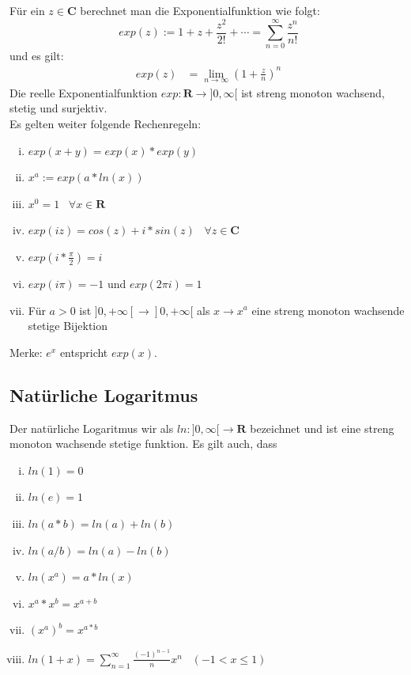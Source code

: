 \documentclass[8pt]{article}
\begin{document}
\begin{multicols*}{3}
Für ein $z \in \mathbf{C}$ berechnet man die Exponentialfunktion wie folgt:
$$
  exp(z) := 1 + z + \frac{z^2}{2!} + \cdots = \sum_{n = 0}^\infty \frac{z^n}{n!}
$$
und es gilt:
\begin{align*}
  exp(z) &= \lim_{n \rightarrow \infty} (1 + \frac{z}{n})^n
\end{align*}
Die reelle Exponentialfunktion $exp: \mathbf{R} \rightarrow ]0, \infty[$ ist streng monoton wachsend,
stetig und surjektiv.\\
Es gelten weiter folgende Rechenregeln:
\begin{enumerate}[(i)]
  \item $exp(x + y) = exp(x) * exp(y)$
  \item $x^a := exp(a * ln(x))$
  \item $x^0 = 1 \;\;\; \forall x \in \mathbf{R}$
  \item $exp(iz) = cos(z) + i*sin(z) \;\;\; \forall z \in \mathbf{C}$
  \item $exp(i*\frac{\pi}{2}) = i$
  \item $exp(i\pi) = -1$ und $exp(2\pi i) = 1$
  \item Für $a > 0$ ist $]0, +\infty[ \rightarrow ]0, +\infty[$ als $x \rightarrow x^a$ eine
  streng monoton wachsende stetige Bijektion
\end{enumerate}
Merke: $e^x$ entspricht $exp(x)$.

\subsection{Natürliche Logaritmus}

Der natürliche Logaritmus wir als $ln: ]0, \infty[ \rightarrow \mathbf{R}$ bezeichnet
und ist eine streng monoton wachsende stetige funktion. Es gilt auch, dass
\begin{enumerate}[(i)]
  \item $ln(1) = 0$
  \item $ln(e) = 1$
  \item $ln(a * b) = ln(a) + ln(b)$
  \item $ln(a / b) = ln(a) - ln(b)$
  \item $ln(x^a) = a * ln(x)$
  \item $x^a * x^b = x^{a + b}$
  \item $(x^a)^b = x^{a * b}$
  \item $ln(1+x) = \sum_{n=1}^{\infty} \frac{(-1)^{n-1}}{n} x^n \;\;\; (-1 < x \leq 1)$
\end{enumerate}


\end{multicols*}
\end{document}
